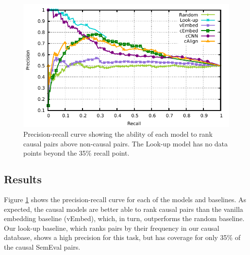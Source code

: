 \begin{figure}[t]
\begin{center}
\includegraphics[width=\textwidth]{mainmatter/emnlp2016-causal/direct_noBi.pdf} %
\caption{{Precision-recall curve showing the ability of each model to rank causal pairs above non-causal pairs. 
The Look-up model has no data points beyond the 35\% recall point.}}
\label{fig:rpcurve_all}
\end{center}
\end{figure}

\subsection{Results}
\label{sec-emnlp2016:results}

Figure \ref{fig:rpcurve_all} shows the precision-recall curve for each of the models and baselines. 
As expected, the causal models are better able to rank causal pairs than the vanilla embedding baseline (vEmbed), which, in turn, outperforms the random baseline.  Our look-up baseline, which ranks pairs by their frequency in our causal database, shows a high precision for this task, but has coverage for only 35\% of the causal SemEval pairs.
%

